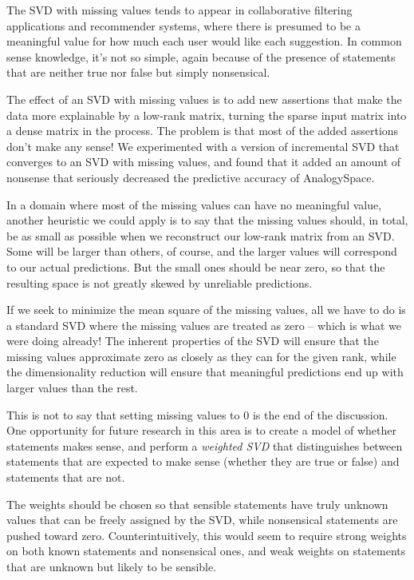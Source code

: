\documentclass[11pt]{article}
\begin{document}
The SVD with missing values tends to appear in collaborative filtering
applications and recommender systems, where there is presumed to be a meaningful
value for how much each user would like each suggestion. In common sense
knowledge, it's not so simple, again because of the presence of statements that
are neither true nor false but simply nonsensical.

The effect of an SVD with missing values is to add new assertions that make the
data more explainable by a low-rank matrix, turning the sparse input matrix
into a dense matrix in the process. The problem is that most of the added
assertions don't make any sense! We experimented with a version of incremental
SVD that converges to an SVD with missing values, and found that it added an
amount of nonsense that seriously decreased the predictive accuracy of
AnalogySpace.

In a domain where most of the missing values can have no meaningful value,
another heuristic we could apply is to say that the missing values should,
in total, be as small as possible when we reconstruct our low-rank matrix from
an SVD. Some will be larger than others, of course, and the larger values will
correspond to our actual predictions. But the small ones should be near zero,
so that the resulting space is not greatly skewed by unreliable predictions.

If we seek to minimize the mean square of the missing values, all we have to do
is a standard SVD where the missing values are treated as zero -- which is what
we were doing already! The inherent properties of the SVD will ensure that the
missing values approximate zero as closely as they can for the given rank,
while the dimensionality reduction will ensure that meaningful predictions end
up with larger values than the rest.

This is not to say that setting missing values to 0 is the end of the
discussion. One opportunity for future research in this area is to create a
model of whether statements makes sense, and perform a {\em weighted SVD} that
distinguishes between statements that are expected to make sense (whether they
are true or false) and statements that are not.

The weights should be chosen so that sensible statements have truly unknown
values that can be freely assigned by the SVD, while nonsensical statements are
pushed toward zero. Counterintuitively, this would seem to require strong
weights on both known statements and nonsensical ones, and weak weights on
statements that are unknown but likely to be sensible.
\end{document}
